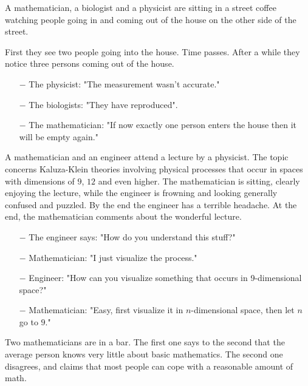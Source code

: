 A mathematician, a biologist and a physicist are sitting in a street coffee watching people going in and coming out of the house on the other side of the street. 

First they see two people going into the house. Time passes. After a while they notice three persons coming out of the house. 

\begin{itemize}	 
	\item[$-$] The physicist: "The measurement wasn't accurate."

	\item[$-$] The biologists: "They have reproduced".

	\item[$-$] The mathematician: "If now exactly one person enters the house then it will be empty again."
\end{itemize}
	\begin{center}\underline{\hspace{5 cm}}\end{center}

A mathematician and an engineer attend a lecture by a physicist. The topic concerns Kaluza-Klein theories involving physical processes that occur in spaces with dimensions of $9$, $12$ and even higher. The mathematician is sitting, clearly enjoying the lecture, while the engineer is frowning and looking generally confused and puzzled. By the end the engineer has a terrible headache. At the end, the mathematician comments about the wonderful lecture. 

\begin{itemize}	 
	\item[$-$] The engineer says: "How do you understand this stuff?"

	\item[$-$] Mathematician: "I just visualize the process."

	\item[$-$] Engineer: "How can you visualize something that occurs in 9-dimensional space?"

	\item[$-$] Mathematician: "Easy, first visualize it in $n$-dimensional space, then let $n$ go to $9$."
\end{itemize}
	\begin{center}\underline{\hspace{5 cm}}\end{center}

Two mathematicians are in a bar. The first one says to the second that the average person knows very little about basic mathematics. The second one disagrees, and claims that most people can cope with a reasonable amount of math. 

